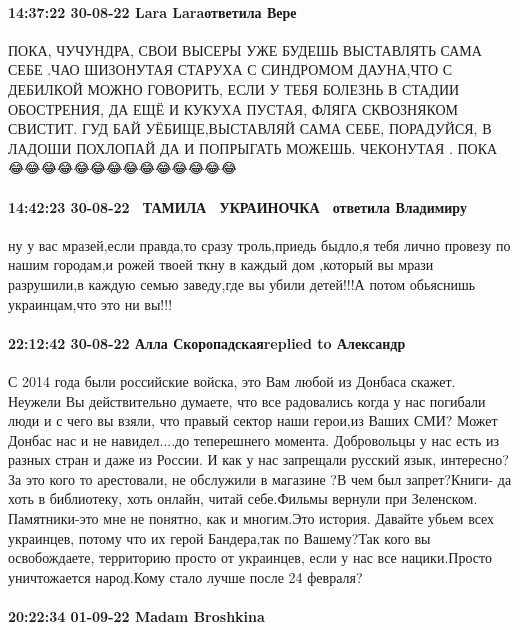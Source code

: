 \paragraph{14:37:22 30-08-22 Lara Laraответила Вере}

ПОКА, ЧУЧУНДРА, СВОИ ВЫСЕРЫ УЖЕ БУДЕШЬ ВЫСТАВЛЯТЬ САМА СЕБЕ .ЧАО ШИЗОНУТАЯ
СТАРУХА С СИНДРОМОМ ДАУНА,ЧТО С ДЕБИЛКОЙ МОЖНО ГОВОРИТЬ, ЕСЛИ У ТЕБЯ БОЛЕЗНЬ В
СТАДИИ ОБОСТРЕНИЯ, ДА ЕЩЁ И КУКУХА ПУСТАЯ, ФЛЯГА СКВОЗНЯКОМ СВИСТИТ. ГУД БАЙ
УЁБИЩЕ,ВЫСТАВЛЯЙ САМА СЕБЕ, ПОРАДУЙСЯ, В ЛАДОШИ ПОХЛОПАЙ ДА И ПОПРЫГАТЬ МОЖЕШЬ.
ЧЕКОНУТАЯ . ПОКА😂😂😂😂😂😂😂😂😂😂😂😂😂😂

\paragraph{14:42:23 30-08-22 💙💛ТАМИЛА 💙💛УКРАИНОЧКА 💙💛ответила Владимиру}

ну у вас мразей,если правда,то сразу троль,приедь быдло,я тебя лично провезу по
нашим городам,и рожей твоей ткну в каждый дом ,который вы мрази разрушили,в
каждую семью заведу,где вы убили детей!!!А потом обьяснишь украинцам,что это ни
вы!!!

\paragraph{22:12:42 30-08-22 Алла Скоропадскаяreplied to Александр}

С 2014 года были российские войска, это Вам любой из Донбаса скажет.
Неужели Вы действительно думаете, что все радовались когда у нас погибали люди и с чего вы взяли, что правый сектор наши герои,из Ваших СМИ?
Может Донбас нас и не навидел....до теперешнего момента.
Добровольцы у нас есть из разных стран и даже из России.
И как у нас запрещали русский язык, интересно?За это кого то арестовали, не обслужили в магазине ?В чем был запрет?Книги- да хоть в библиотеку, хоть онлайн, читай себе.Фильмы вернули при Зеленском. Памятники-это мне не понятно, как и многим.Это история.
Давайте убьем всех украинцев, потому что их герой Бандера,так по Вашему?Так кого вы освобождаете, территорию просто от украинцев, если у нас все нацики.Просто уничтожается народ.Кому стало лучше после 24 февраля?


\paragraph{20:22:34 01-09-22 Madam Broshkina}

